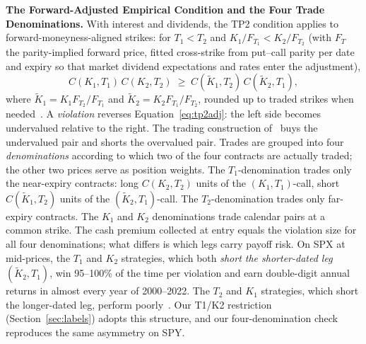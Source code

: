 \documentclass[sigconf,review]{acmart}
\begin{document}
\medskip\noindent\textbf{The Forward-Adjusted Empirical Condition and the Four Trade Denominations.}
\label{sec:denominations}
With interest and dividends, the TP2 condition applies to forward-moneyness-aligned strikes: for $T_1<T_2$ and $K_1/F_{T_1}<K_2/F_{T_2}$ (with $F_T$ the parity-implied forward price, fitted cross-strike from put--call parity per date and expiry so that market dividend expectations and rates enter the adjustment),
\begin{equation}
C(K_1,T_1)\,C(K_2,T_2)\;\ge\;C(\tilde K_1,T_2)\,C(\tilde K_2,T_1),
\label{eq:tp2adj}
\end{equation}
where $\tilde K_1=K_1 F_{T_2}/F_{T_1}$ and $\tilde K_2=K_2 F_{T_1}/F_{T_2}$, rounded up to traded strikes when needed~\cite{glasserman2025tp2}. A \emph{violation} reverses Equation~\eqref{eq:tp2adj}: the left side becomes undervalued relative to the right. The trading construction of~\cite{glasserman2025tp2} buys the undervalued pair and shorts the overvalued pair. Trades are grouped into four \emph{denominations} according to which two of the four contracts are actually traded; the other two prices serve as position weights. The $T_1$-denomination trades only the near-expiry contracts: long $C(K_2,T_2)$ units of the $(K_1,T_1)$-call, short $C(\tilde K_1,T_2)$ units of the $(\tilde K_2,T_1)$-call. The $T_2$-denomination trades only far-expiry contracts. The $K_1$ and $K_2$ denominations trade calendar pairs at a common strike. The cash premium collected at entry equals the violation size for all four denominations; what differs is which legs carry payoff risk. On SPX at mid-prices, the $T_1$ and $K_2$ strategies, which both \emph{short the shorter-dated leg} $(\tilde K_2,T_1)$, win 95--100\% of the time per violation and earn double-digit annual returns in almost every year of 2000--2022. The $T_2$ and $K_1$ strategies, which short the longer-dated leg, perform poorly~\cite{glasserman2025tp2}. Our T1/K2 restriction (Section~\ref{sec:labels}) adopts this structure, and our four-denomination check reproduces the same asymmetry on SPY.
\end{document}
